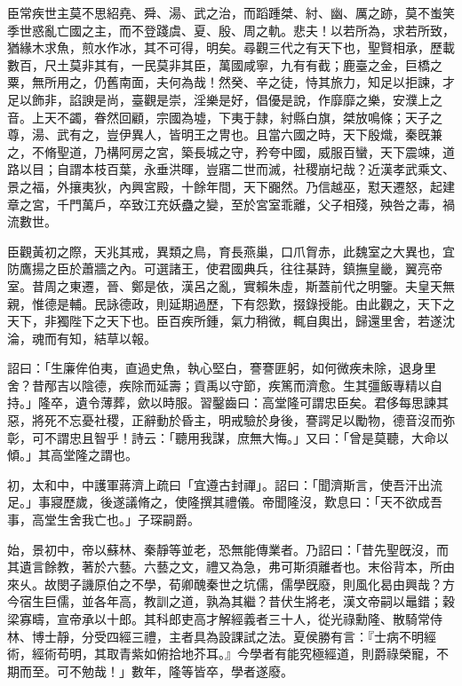\begin{pinyinscope}
臣常疾世主莫不思紹堯、舜、湯、武之治，而蹈踵桀、紂、幽、厲之跡，莫不蚩笑季世惑亂亡國之主，而不登踐虞、夏、殷、周之軌。悲夫！以若所為，求若所致，猶緣木求魚，煎水作冰，其不可得，明矣。尋觀三代之有天下也，聖賢相承，歷載數百，尺土莫非其有，一民莫非其臣，萬國咸寧，九有有截；鹿臺之金，巨橋之粟，無所用之，仍舊南面，夫何為哉！然癸、辛之徒，恃其旅力，知足以拒諫，才足以飾非，諂諛是尚，臺觀是崇，淫樂是好，倡優是說，作靡靡之樂，安濮上之音。上天不蠲，眷然回顧，宗國為墟，下夷于隷，紂縣白旗，桀放鳴條；天子之尊，湯、武有之，豈伊異人，皆明王之冑也。且當六國之時，天下殷熾，秦旣兼之，不脩聖道，乃構阿房之宮，築長城之守，矜夸中國，威服百蠻，天下震竦，道路以目；自謂本枝百葉，永垂洪暉，豈寤二世而滅，社稷崩圮哉？近漢孝武乘文、景之福，外攘夷狄，內興宮殿，十餘年間，天下嚻然。乃信越巫，懟天遷怒，起建章之宮，千門萬戶，卒致江充妖蠱之變，至於宮室乖離，父子相殘，殃咎之毒，禍流數世。

臣觀黃初之際，天兆其戒，異類之鳥，育長燕巢，口爪胷赤，此魏室之大異也，宜防鷹揚之臣於蕭牆之內。可選諸王，使君國典兵，往往棊跱，鎮撫皇畿，翼亮帝室。昔周之東遷，晉、鄭是依，漢呂之亂，實賴朱虛，斯蓋前代之明鑒。夫皇天無親，惟德是輔。民詠德政，則延期過歷，下有怨歎，掇錄授能。由此觀之，天下之天下，非獨陛下之天下也。臣百疾所鍾，氣力稍微，輒自輿出，歸還里舍，若遂沈淪，魂而有知，結草以報。

詔曰：「生廉侔伯夷，直過史魚，執心堅白，謇謇匪躬，如何微疾未除，退身里舍？昔邴吉以陰德，疾除而延壽；貢禹以守節，疾篤而濟愈。生其彊飯專精以自持。」隆卒，遺令薄葬，歛以時服。習鑿齒曰：高堂隆可謂忠臣矣。君侈每思諫其惡，將死不忘憂社稷，正辭動於昏主，明戒驗於身後，謇諤足以勵物，德音沒而弥彰，可不謂忠且智乎！詩云：「聽用我謀，庶無大悔。」又曰：「曾是莫聽，大命以傾。」其高堂隆之謂也。

初，太和中，中護軍蔣濟上疏曰「宜遵古封禪」。詔曰：「聞濟斯言，使吾汗出流足。」事寢歷歲，後遂議脩之，使隆撰其禮儀。帝聞隆沒，歎息曰：「天不欲成吾事，高堂生舍我亡也。」子琛嗣爵。

始，景初中，帝以蘇林、秦靜等並老，恐無能傳業者。乃詔曰：「昔先聖旣沒，而其遺言餘教，著於六藝。六藝之文，禮又為急，弗可斯須離者也。末俗背本，所由來乆。故閔子譏原伯之不學，荀卿醜秦世之坑儒，儒學旣廢，則風化曷由興哉？方今宿生巨儒，並各年高，教訓之道，孰為其繼？昔伏生將老，漢文帝嗣以鼂錯；穀梁寡疇，宣帝承以十郎。其科郎吏高才解經義者三十人，從光祿勳隆、散騎常侍林、博士靜，分受四經三禮，主者具為設課試之法。夏侯勝有言：『士病不明經術，經術苟明，其取青紫如俯拾地芥耳。』今學者有能究極經道，則爵祿榮寵，不期而至。可不勉哉！」數年，隆等皆卒，學者遂廢。


\end{pinyinscope}
